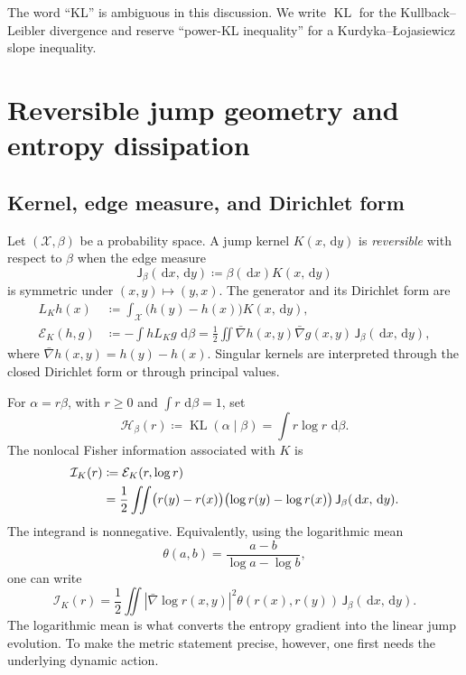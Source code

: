 \documentclass[11pt]{article}
\theoremstyle{definition}
\DeclareMathOperator{\KL}{KL}
\newcommand{\dd}{\,\mathrm d}
\newcommand{\cE}{\mathcal E}
\newcommand{\cI}{\mathcal I}
\newcommand{\cH}{\mathcal H}
\newcommand{\Jm}{\mathsf J}
\newcommand{\bgrad}{\bar\nabla}
\newcommand{\abs}[1]{\left\lvert #1\right\rvert}
\begin{document}
The word ``KL'' is ambiguous in this discussion.  We write $\KL$ for the
Kullback--Leibler divergence and reserve ``power-KL inequality'' for a
Kurdyka--{\L}ojasiewicz slope inequality.

\section{Reversible jump geometry and entropy dissipation}

\subsection{Kernel, edge measure, and Dirichlet form}

Let $(\mathcal X,\beta)$ be a probability space.  A jump kernel
$K(x,\dd y)$ is \emph{reversible} with respect to $\beta$ when the edge
measure
\begin{equation}\label{eq:edge-measure}
  \Jm_\beta(\dd x,\dd y)
  \coloneqq \beta(\dd x)K(x,\dd y)
\end{equation}
is symmetric under $(x,y)\mapsto(y,x)$.  The generator and its Dirichlet form
are
\begin{align}
  L_K h(x)
  &\coloneqq \int_{\mathcal X}\bigl(h(y)-h(x)\bigr)K(x,\dd y),
  \label{eq:jump-generator}\\
  \cE_K(h,g)
  &\coloneqq -\int hL_Kg\,\dd\beta
   =\frac12\iint
       \bgrad h(x,y)\bgrad g(x,y)\,
       \Jm_\beta(\dd x,\dd y),
  \label{eq:jump-dirichlet}
\end{align}
where $\bgrad h(x,y)=h(y)-h(x)$.  Singular kernels are interpreted through
the closed Dirichlet form or through principal values.

For $\alpha=r\beta$, with $r\geq0$ and $\int r\,\dd\beta=1$, set
\begin{equation}\label{eq:relative-entropy-density}
  \cH_\beta(r)
  \coloneqq \KL(\alpha\mid\beta)
  =\int r\log r\,\dd\beta.
\end{equation}
The nonlocal Fisher information associated with $K$ is
\begin{align}
  \cI_K(r)
  &\coloneqq \cE_K(r,\log r)\label{eq:nonlocal-fisher}\\
  &=\frac12\iint
      \bigl(r(y)-r(x)\bigr)
      \bigl(\log r(y)-\log r(x)\bigr)
      \,\Jm_\beta(\dd x,\dd y).
  \notag
\end{align}
The integrand is nonnegative.  Equivalently, using the logarithmic mean
\[
  \theta(a,b)=\frac{a-b}{\log a-\log b},
\]
one can write
\begin{equation}\label{eq:nonlocal-fisher-logmean}
  \cI_K(r)
  =\frac12\iint
  \abs{\bgrad\log r(x,y)}^2
  \theta(r(x),r(y))\,
  \Jm_\beta(\dd x,\dd y).
\end{equation}
The logarithmic mean is what converts the entropy gradient into the linear
jump evolution.  To make the metric statement precise, however, one first
needs the underlying dynamic action.
\end{document}
